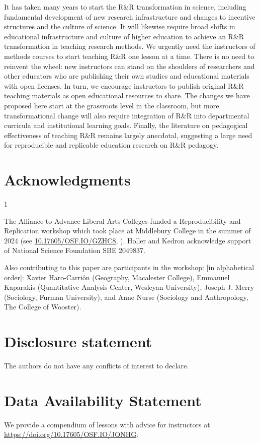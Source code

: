 \documentclass[
  12pt]{article}
\newcommand{\anon}{1}
\begin{document}
It has taken many years to start the R\&R transformation in science, including fundamental development of new research infrastructure and changes to incentive structures and the culture of science. 
It will likewise require broad shifts in educational infrastructure and culture of higher education to achieve an R\&R transformation in teaching research methods.
We urgently need the instructors of methods courses to start teaching R\&R one lesson at a time.
There is no need to reinvent the wheel: new instructors can stand on the shoulders of researchers and other educators who are publishing their own studies and educational materials with open licenses. 
In turn, we encourage instructors to publish original R\&R teaching materials as open educational resources to share.
The changes we have proposed here start at the grassroots level in the classroom, but more transformational change will also require integration of R\&R into departmental curricula and institutional learning goals.
Finally, the literature on pedagogical effectiveness of teaching R\&R remains largely anecdotal, suggesting a large need for reproducible and replicable education research on R\&R pedagogy.


\section{Acknowledgments}

\anon{
The Alliance to Advance Liberal Arts Colleges funded a Reproducibility and Replication workshop which took place at Middlebury College in the summer of 2024 (see \url{10.17605/OSF.IO/GZHC8}, \cite{aalac_osf}). 
Holler and Kedron acknowledge support of National Science Foundation SBE 2049837.

Also contributing to this paper are participants in the workshop: [in alphabetical order]: Xavier Haro-Carrión (Geography, Macalester College), Emmanuel Kaparakis (Quantitative Analysis Center, Wesleyan University), Joseph J. Merry (Sociology, Furman University), and Anne Nurse (Sociology and Anthropology, The College of Wooster).
} \fi

\section{Disclosure statement}\label{disclosure-statement}

The authors do not have any conflicts of interest to declare.

\section{Data Availability Statement}\label{data-availability-statement}

We provide a compendium of lessons with advice for instructors at \url{https://doi.org/10.17605/OSF.IO/JQNHG}. 


\end{document}
